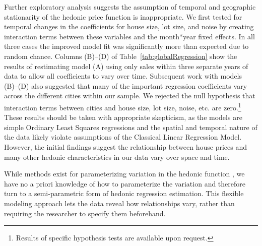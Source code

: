 \documentclass{article}\usepackage{graphicx, color}
\begin{document}
Further exploratory analysis suggests the assumption of temporal and geographic stationarity of the hedonic price function is inappropriate. We first tested for temporal changes in the coefficients for house size, lot size, and noise by creating interaction terms between these variables and the month*year fixed effects. In all three cases the improved model fit was significantly more than expected due to random chance. Columns (B)--(D) of Table~\ref{tab:globalRegression} show the results of restimating model (A) using only sales within three separate years of data to allow all coefficients to vary over time. Subsequent work with models (B)--(D) also suggested that many of the important regression coefficients vary across the different cities within our sample. We rejected the null hypothesis that interaction terms between cities and house size, lot size, noise, etc. are zero.\footnote{Results of specific hypothesis tests are available upon request.}  These results should be taken with appropriate skepticism, as the models are simple Ordinary Least Squares regressions and the spatial and temporal nature of the data likely violate assumptions of the Classical Linear Regression Model. However, the initial findings suggest the relationship between house prices and many other hedonic characteristics in our data vary over space and time. 

While methods exist for parameterizing variation in the hedonic function \citep[such as spatial expansion as suggested by][]{Casetti1972}, we have no a priori knowledge of how to parameterize the variation and therefore turn to a semi-parametric form of hedonic regression estimation. This flexible modeling approach lets the data reveal how relationships vary, rather than requiring the researcher to specify them beforehand. 
\end{document}
